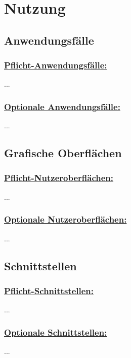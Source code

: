 %
%


\chapter{Nutzung}
\label{Nutzung}



\section{Anwendungsfälle}

\subsection*{\underline{Pflicht-Anwendungsfälle:}}

...
\\


\subsection*{\underline{Optionale Anwendungsfälle:}}

...
\\


\section{Grafische Oberflächen}

\subsection*{\underline{Pflicht-Nutzeroberflächen:}}

...
\\


\subsection*{\underline{Optionale Nutzeroberflächen:}}

...
\\


\section{Schnittstellen}

\subsection*{\underline{Pflicht-Schnittstellen:}}

...
\\


\subsection*{\underline{Optionale Schnittstellen:}}

...
\\


